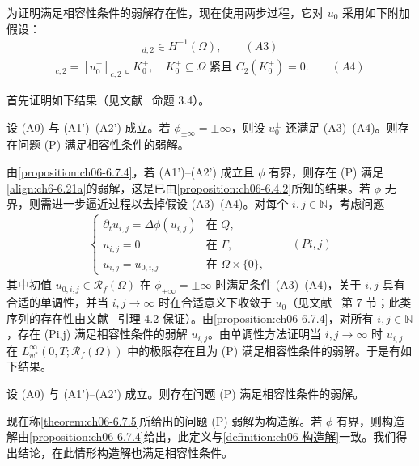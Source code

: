 \documentclass[../../main.tex]{subfiles}%
\begin{document}
为证明满足相容性条件的弱解存在性，现在使用两步过程，它对 $u_0$ 采用如下附加假设：
\begin{align*}
[u^\pm_0]_{d,2}\in H^{-1}(\Omega), \qquad(A3)
\end{align*}
\begin{align*}
[u^\pm_0]_{c,2}=[u^\pm_0]_{c,2}\llcorner K^\pm_0,\quad
K^\pm_0\subseteq\Omega\text{ 紧且 }C_2(K^\pm_0)=0. \qquad(A4)
\end{align*}

首先证明如下结果（见文献~\cite{ref87} 命题 3.4）。

\begin{proposition}\label{proposition:ch06-6.7.4}
设 (A0) 与 (A1')--(A2') 成立。若 $\phi_{\pm\infty}=\pm\infty$，则设 $u^\pm_0$ 还满足 (A3)--(A4)。则存在问题 (P) 满足相容性条件的弱解。
\end{proposition}

由\cref{proposition:ch06-6.7.4}，若 (A1')--(A2') 成立且 $\phi$ 有界，则存在 (P) 满足\eqref{align:ch6-6.21a}的弱解，这是已由\cref{proposition:ch06-6.4.2}所知的结果。若 $\phi$ 无界，则需进一步逼近过程以去掉假设 (A3)--(A4)。对每个 $i,j\in\mathbb{N}$，考虑问题
\begin{align*}
\begin{cases}
\partial_t u_{i,j}=\Delta\phi(u_{i,j}) & \text{在 }Q,\\
u_{i,j}=0 & \text{在 }\Gamma,\\
u_{i,j}=u_{0,i,j} & \text{在 }\Omega\times\{0\},
\end{cases}
\qquad(Pi,j)
\end{align*}
其中初值 $u_{0,i,j}\in\mathscr{R}_f(\Omega)$ 在 $\phi_{\pm\infty}=\pm\infty$ 时满足条件 (A3)--(A4)，关于 $i,j$ 具有合适的单调性，并当 $i,j\to\infty$ 时在合适意义下收敛于 $u_0$（见文献~\cite{ref87} 第 7 节；此类序列的存在性由文献~\cite{ref10} 引理 4.2 保证）。由\cref{proposition:ch06-6.7.4}，对所有 $i,j\in\mathbb{N}$，存在 (Pi,j) 满足相容性条件的弱解 $u_{i,j}$。由单调性方法证明当 $i,j\to\infty$ 时 $u_{i,j}$ 在 $L^\infty_{w^*}(0,T;\mathscr{R}_f(\Omega))$ 中的极限存在且为 (P) 满足相容性条件的弱解。于是有如下结果。

\begin{theorem}\label{theorem:ch06-6.7.5}
设 (A0) 与 (A1')--(A2') 成立。则存在问题 (P) 满足相容性条件的弱解。
\end{theorem}

现在称\cref{theorem:ch06-6.7.5}所给出的问题 (P) 弱解为构造解。若 $\phi$ 有界，则构造解由\cref{proposition:ch06-6.7.4}给出，此定义与\cref{definition:ch06-构造解}一致。我们得出结论，在此情形构造解也满足相容性条件。
\end{document}
